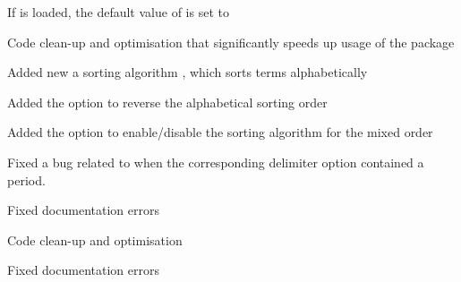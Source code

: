 \begin{changelog}
\begin{change}[version=1.1, date=2021-06-03, beta=false]
		\item If  is loaded, the default value of  is set to 
	\end{change}
	\begin{change}[version=1.2, date=2022-07-09, beta=false]
		\item Code clean-up and optimisation that significantly speeds up usage of the package
		\item Added new a sorting algorithm , which sorts terms alphabetically
		\item Added the option  to reverse the alphabetical sorting order
		\item Added the option  to enable/disable the sorting algorithm for the mixed order
		\item Fixed a bug related to  when the corresponding delimiter option contained a period.
		\item Fixed documentation errors
	\end{change}
	\begin{change}[version=1.3, date=2022-07-09, beta=false]
		\item Code clean-up and optimisation
		\item Fixed documentation errors
	\end{change}
\end{changelog}
	
